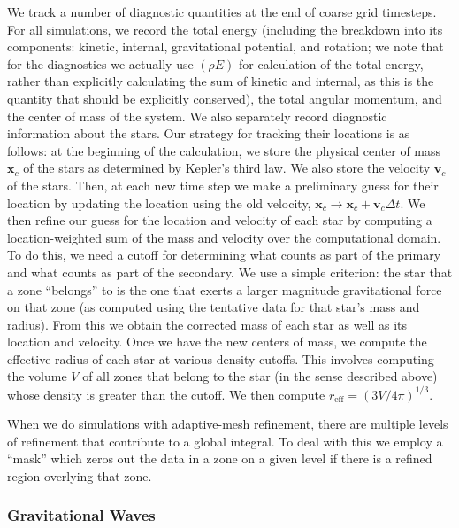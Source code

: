 \documentclass[iop,numberedappendix]{../emulateapj}
\begin{document}
We track a number of diagnostic quantities at the end of coarse grid timesteps. 
For all simulations, we record the total energy (including the breakdown into
its components: kinetic, internal, gravitational potential, and rotation; we note
that for the diagnostics we actually use $(\rho E)$ for calculation of the total energy,
rather than explicitly calculating the sum of kinetic and internal, as this is
the quantity that should be explicitly conserved), 
the total angular momentum, and the center of mass of the system. 
We also separately record diagnostic 
information about the stars. Our strategy for tracking their 
locations is as follows: at the beginning of the calculation, we store the 
physical center of mass $\mathbf{x}_{c}$ of the stars as determined 
by Kepler's third law. We also store the velocity $\mathbf{v}_{c}$ 
of the stars. Then, at each new time step we make a preliminary guess for their 
location by updating the location using the old velocity, 
$\mathbf{x}_{c} \rightarrow \mathbf{x}_{c} + \mathbf{v}_{c} \Delta t$.
We then refine our guess for the location and velocity of each star by computing a
location-weighted sum of the mass and velocity over the computational domain. 
To do this, we need a cutoff for determining what counts as part of the primary 
and what counts as part of the secondary. We use a simple criterion: the star
that a zone ``belongs'' to is the one that exerts a larger magnitude
gravitational force on that zone (as computed using the tentative data
for that star's mass and radius). From this we obtain the corrected mass
of each star as well as its location and velocity. Once we have the new centers of mass,
we compute the effective radius of each star at various density cutoffs. This involves 
computing the volume $V$ of all zones that belong to the star (in the sense described above) 
whose density is greater than the cutoff. We then compute $r_{\text{eff}} = (3V/4\pi)^{1/3}.$

When we do simulations with adaptive-mesh refinement, there are multiple levels of refinement 
that contribute to a global integral. To deal with this we employ a ``mask'' which zeros out 
the data in a zone on a given level if there is a refined region overlying that zone.

\subsubsection{Gravitational Waves}
\label{sec:grvatational_waves}
\end{document}
